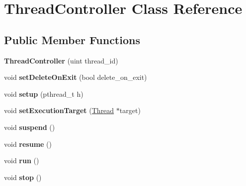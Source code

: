 \hypertarget{classThreadController}{
\section{ThreadController Class Reference}
\label{classThreadController}
}
\subsection*{Public Member Functions}
\begin{DoxyCompactItemize}
\item 
\hypertarget{classThreadController_a7f95421885845c035d977fe0340784af}{
{\bfseries ThreadController} (uint thread\_\-id)}
\label{classThreadController_a7f95421885845c035d977fe0340784af}

\item 
\hypertarget{classThreadController_abcb1eeeade9465f8b9d288ce05a35b90}{
void {\bfseries setDeleteOnExit} (bool delete\_\-on\_\-exit)}
\label{classThreadController_abcb1eeeade9465f8b9d288ce05a35b90}

\item 
\hypertarget{classThreadController_a9cd2328f7af385c70a37a5f07d449bdb}{
void {\bfseries setup} (pthread\_\-t h)}
\label{classThreadController_a9cd2328f7af385c70a37a5f07d449bdb}

\item 
\hypertarget{classThreadController_a0c1ccf8af0171905931023efbf45ea5c}{
void {\bfseries setExecutionTarget} (\hyperlink{classThread}{Thread} $\ast$target)}
\label{classThreadController_a0c1ccf8af0171905931023efbf45ea5c}

\item 
\hypertarget{classThreadController_a78662807f4c0bf1714f2aeefe6205ced}{
void {\bfseries suspend} ()}
\label{classThreadController_a78662807f4c0bf1714f2aeefe6205ced}

\item 
\hypertarget{classThreadController_a53489422689e5ddcffde97d5c726154a}{
void {\bfseries resume} ()}
\label{classThreadController_a53489422689e5ddcffde97d5c726154a}

\item 
\hypertarget{classThreadController_a74a5e83564dcde1144f6c2d9394bd6ab}{
void {\bfseries run} ()}
\label{classThreadController_a74a5e83564dcde1144f6c2d9394bd6ab}

\item 
\hypertarget{classThreadController_ad150063920776421824399b975996117}{
void {\bfseries stop} ()}
\label{classThreadController_ad150063920776421824399b975996117}


\end{DoxyCompactItemize}

